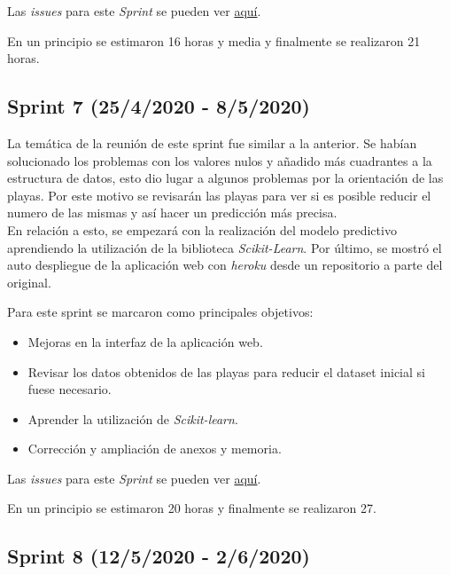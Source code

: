 Las \emph{issues} para este \emph{Sprint} se pueden ver \href{https://github.com/psnti/TFG-Pablo-Santidrian-Tudanca/milestone/6}{aquí}.


En un principio se estimaron 16 horas y media y finalmente se realizaron 21 horas.

\subsection{Sprint 7 (25/4/2020 - 8/5/2020)}\label{Sprint-7}

La temática de la reunión de este sprint fue similar a la anterior. Se habían solucionado los problemas con los valores nulos y añadido más cuadrantes a la estructura de datos, esto dio lugar a algunos problemas por la orientación de las playas. Por este motivo se revisarán las playas para ver si es posible reducir el numero de las mismas y así hacer un predicción más precisa.\\
En relación a esto, se empezará con la realización del modelo predictivo aprendiendo la utilización de la biblioteca \emph{Scikit-Learn}.
Por último, se mostró el auto despliegue de la aplicación web con \emph{heroku} desde un repositorio a parte del original.

Para este sprint se marcaron como principales objetivos:
\begin{itemize}
	\item Mejoras en la interfaz de la aplicación web.
	\item Revisar los datos obtenidos de las playas para reducir el dataset inicial si fuese necesario.
	\item Aprender la utilización de \emph{Scikit-learn}.
	\item Corrección y ampliación de anexos y memoria.
\end{itemize} 

Las \emph{issues} para este \emph{Sprint} se pueden ver \href{https://github.com/psnti/TFG-Pablo-Santidrian-Tudanca/milestone/7}{aquí}.


En un principio se estimaron 20 horas y finalmente se realizaron 27.

\subsection{Sprint 8 (12/5/2020 - 2/6/2020)}\label{Sprint-8}

